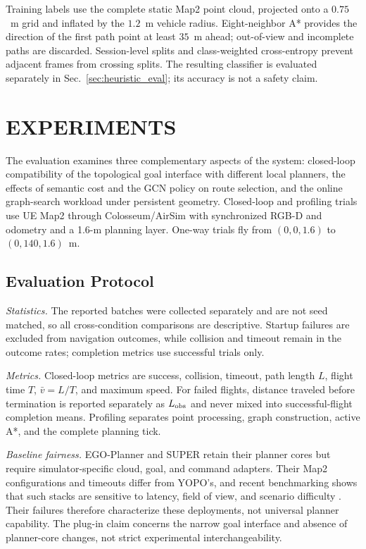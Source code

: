 \documentclass[letterpaper,10pt,conference]{ieeeconf}
\begin{document}
Training labels use the complete static Map2 point cloud, projected onto a
$0.75$~m grid and inflated by the $1.2$~m vehicle radius.  Eight-neighbor A*
provides the direction of the first path point at least $35$~m ahead;
out-of-view and incomplete paths are discarded.  Session-level splits and
class-weighted cross-entropy prevent adjacent frames from crossing splits.
The resulting classifier is evaluated separately in
Sec.~\ref{sec:heuristic_eval}; its accuracy is not a safety claim.

\section{EXPERIMENTS}
\label{sec:experiments}
The evaluation examines three complementary aspects of the system: closed-loop
compatibility of the topological goal interface with different local planners,
the effects of semantic cost and the GCN policy on route selection,
and the online graph-search workload under persistent geometry.
Closed-loop and profiling trials use UE Map2 through Colosseum/AirSim
\cite{airsim} with synchronized RGB-D and odometry and a 1.6-m planning
layer.  One-way trials fly from $(0,0,1.6)$ to $(0,140,1.6)$~m.

\subsection{Evaluation Protocol}
\label{sec:protocol}
\emph{Statistics.}  The reported batches were collected separately and are
not seed matched, so all cross-condition comparisons are descriptive.  Startup
failures are excluded from navigation outcomes, while collision and timeout
remain in the outcome rates; completion metrics use successful trials only.

\emph{Metrics.}  Closed-loop metrics are success, collision, timeout, path
length $L$, flight time $T$, $\bar v=L/T$, and maximum speed.  For failed
flights, distance traveled before termination is reported separately as
$L_{\rm obs}$ and never mixed into successful-flight completion means.
Profiling separates point processing, graph construction, active A*, and the
complete planning tick.

\emph{Baseline fairness.}  EGO-Planner \cite{egoplanner} and SUPER
\cite{super} retain their planner cores but require simulator-specific cloud,
goal, and command adapters.  Their Map2 configurations and timeouts differ
from YOPO's, and recent benchmarking shows that such stacks are sensitive to
latency, field of view, and scenario difficulty \cite{flightbench}.  Their
failures therefore characterize these deployments, not universal planner
capability.  The plug-in claim concerns the narrow goal interface and absence
of planner-core changes, not strict experimental interchangeability.
\end{document}
